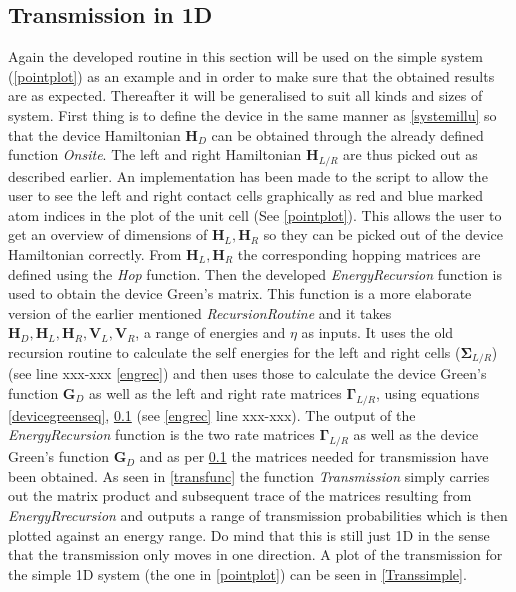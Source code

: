 \subsection{Transmission in 1D}
Again the developed routine in this section will be used on the simple system (\cref{pointplot}) as an example and in order to make sure that the obtained results are as expected. Thereafter it will be generalised to suit all kinds and sizes of system. First thing is to define the device in the same manner as \cref{systemillu} so that the device Hamiltonian \(\textbf{H}_D\) can be obtained through the already defined function \textit{Onsite}. The left and right Hamiltonian \(\textbf{H}_{L/R}\) are thus picked out as described earlier. An implementation has been made to the script to allow the user to see the left and right contact cells graphically as red and blue marked atom indices in the plot of the unit cell (See \cref{pointplot}).
This allows the user to get an overview of dimensions of \(\mathbf{H}_L,\mathbf{H}_R\) so they can be picked out of the device Hamiltonian correctly. From \(\mathbf{H}_L,\mathbf{H}_R\) the corresponding hopping matrices are defined using the \textit{Hop} function. Then the developed \textit{EnergyRecursion} function is used to obtain the device Green's matrix. This function is a more elaborate version of the earlier mentioned \textit{RecursionRoutine} and it takes \(\mathbf{H}_D,\mathbf{H}_L,\mathbf{H}_R,\mathbf{V}_L,\mathbf{V}_R\), a range of energies and \(\eta\) as inputs. It uses the old recursion routine to calculate the self energies for the left and right cells (\(\mathbf{\Sigma}_{L/R}\)) (see line xxx-xxx \cref{engrec}) and then uses those to calculate the device Green's function \(\textbf{G}_D\) as well as the left and right rate matrices \(\mathbf{\Gamma}_{L/R}\), using equations \cref{devicegreenseq}, \cref{} (see \cref{engrec} line xxx-xxx).
\vspace{-1\baselineskip}
\vspace{\baselineskip}The output of the \textit{EnergyRecursion} function is the two rate matrices \(\mathbf{\Gamma}_{L/R}\) as well as the device Green's function \(\mathbf{G}_D\) and as per \cref{} the matrices needed for transmission have been obtained. As seen in \cref{transfunc} the function \textit{Transmission} simply carries out the matrix product and subsequent trace of the matrices resulting from \textit{EnergyRrecursion} and outputs a range of transmission probabilities which is then plotted against an energy range. Do mind that this is still just 1D in the sense that the transmission only moves in one direction. A plot of the transmission for the simple 1D system (the one in \cref{pointplot}) can be seen in \cref{Transsimple}.
